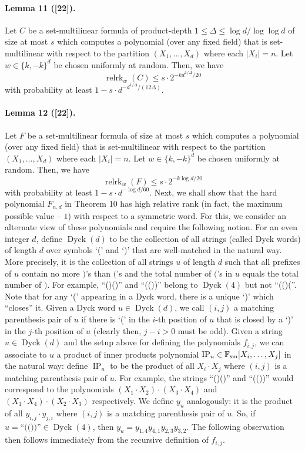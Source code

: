 \paragraph{Lemma 11 ([22]).} Let $C$ be a set-multilinear formula of product-depth $1\leq\Delta\leq\log d/\log\log d$ of size at most $s$ which computes a polynomial (over any fixed field) that is set-multilinear with respect to the partition $(X_1,\ldots,X_d)$ where each $|X_i|=n$. Let $w\in\{k,-k\}^d$ be chosen uniformly at random. Then, we have
\[\operatorname{relrk}_w(C)\leq s\cdot2^{-kd^{1/\Delta}/20}\]
with probability at least $1-s\cdot d^{-d^{1/\Delta}/(12\Delta)}$.
\paragraph{Lemma 12 ([22]).} Let $F$ be a set-multilinear formula of size at most $s$ which computes a polynomial (over any fixed field) that is set-multilinear with respect to the partition $(X_1,\ldots,X_d)$ where each $|X_i|=n$. Let $w\in\{k,-k\}^d$ be chosen uniformly at random. Then, we have
\[\operatorname{relrk}_w(F)\leq s\cdot2^{-k\log d/20}\]
with probability at least $1-s\cdot d^{-\log d/60}$.
Next, we shall show that the hard polynomial $F_{n,d}$ in Theorem 10 has high relative rank (in fact, the maximum possible value -- $1$) with respect to a symmetric word. For this, we consider an alternate view of these polynomials and require the following notion. For an even integer $d$, define $\operatorname{Dyck}(d)$ to be the collection of all strings (called Dyck words) of length $d$ over symbols `(' and `)' that are well-matched in the natural way. More precisely, it is the collection of all strings $u$ of length $d$ such that all prefixes of $u$ contain no more $)$'s than $($'s and the total number of $($'s in $u$ equals the total number of $)$. For example, ``()()'' and ``(())'' belong to $\operatorname{Dyck}(4)$ but not ``(()(''. Note that for any `(' appearing in a Dyck word, there is a unique `)' which ``closes'' it. Given a Dyck word $u\in\operatorname{Dyck}(d)$, we call $(i,j)$ a matching parenthesis pair of $u$ if there is `(' in the $i$-th position of $u$ that is closed by a `)' in the $j$-th position of $u$ (clearly then, $j-i>0$ must be odd).
Given a string $u\in\operatorname{Dyck}(d)$ and the setup above for defining the polynomials $f_{i,j}$, we can associate to $u$ a product of inner products polynomial $\operatorname{IP}_u\in\mathbb F_{\rm sm}[X_i,\ldots,X_j]$ in the natural way: define $\operatorname{IP}_u$ to be the product of all $X_i\cdot X_j$ where $(i,j)$ is a matching parenthesis pair of $u$. For example, the strings ``()()'' and ``(())'' would correspond to the polynomials $(X_1\cdot X_2)\cdot(X_3\cdot X_4)$ and $(X_1\cdot X_4)\cdot(X_2\cdot X_3)$ respectively. We define $y_u$ analogously: it is the product of all $y_{i,j}\cdot y_{j,i}$ where $(i,j)$ is a matching parenthesis pair of $u$. So, if $u=\text{``(())''}\in\operatorname{Dyck}(4)$, then $y_u=y_{1,4}y_{4,1}y_{2,3}y_{3,2}$. The following observation then follows immediately from the recursive definition of $f_{i,j}$.
